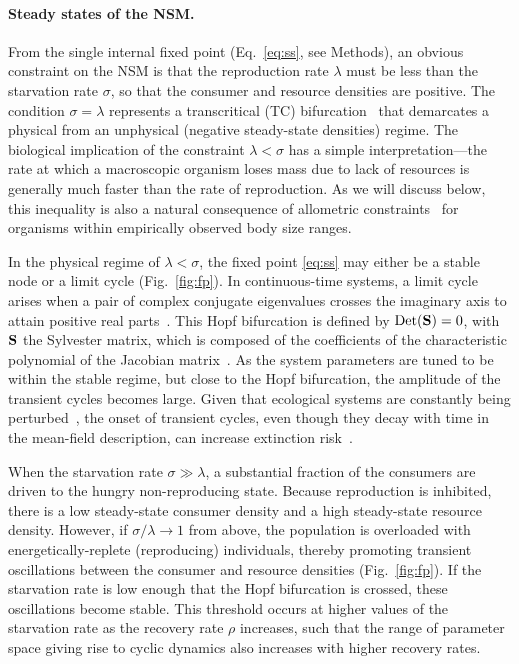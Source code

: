 \documentclass[twocolumn,preprintnumbers,amsmath,amssymb,superscriptaddress]{revtex4}
\begin{document}


\noindent \paragraph*{ {\bf Steady states of the NSM.}} From the single
internal fixed point (Eq.~\eqref{eq:ss}, see Methods), an obvious constraint
on the NSM is that the reproduction rate $\lambda$ must be less than the
starvation rate $\sigma$, so that the consumer and resource densities are
positive.
The condition $\sigma = \lambda$ represents a transcritical (TC)
bifurcation~\citep{Strogatz:2008wo} that demarcates a physical from an
unphysical (negative steady-state densities) regime.  The biological
implication of the constraint $\lambda<\sigma$ has a simple
interpretation---the rate at which a macroscopic organism loses mass due to
lack of resources is generally much faster than the rate of reproduction.  As
we will discuss below, this inequality is also a natural consequence of
allometric constraints~\citep{Kempes:2012hy} for organisms within empirically
observed body size ranges. %

In the physical regime of $\lambda<\sigma$, the fixed point \eqref{eq:ss} may either be a stable node or a limit cycle (Fig.~\ref{fig:fp}).
In continuous-time systems, a limit cycle arises when a pair of complex conjugate eigenvalues crosses the imaginary axis to attain positive real parts~\citep{GuckHolmes}.
This Hopf bifurcation is defined by ${\rm Det}({\bf S}) = 0$, with $\bf S$ the Sylvester matrix, which is composed of the coefficients of the characteristic polynomial of the Jacobian matrix~\citep{Gross:2004p2428}.
As the system parameters are tuned to be within the stable regime, but close to the Hopf bifurcation, the amplitude of the transient cycles becomes large.
Given that ecological systems are constantly being perturbed~\citep{Hastings:2001jh}, the onset of transient cycles, even though they decay with time in the mean-field description, can increase extinction risk~\citep{Neubert:1997wk,Caswell:2005eo,Neubert:2009td}.

When the starvation rate $\sigma\gg\lambda$, a substantial fraction of the
consumers are driven to the hungry non-reproducing state.  Because
reproduction is inhibited, there is a low steady-state consumer density and a
high steady-state resource density.  However, if $\sigma/\lambda\to 1$ from
above, the population is overloaded with energetically-replete (reproducing)
individuals, thereby promoting transient oscillations between the consumer
and resource densities (Fig.~\ref{fig:fp}).  If the starvation rate is low
enough that the Hopf bifurcation is crossed, these oscillations become
stable.  This threshold occurs at higher values of the starvation rate as the recovery rate $\rho$ increases, such that the range of parameter space giving rise to cyclic dynamics also increases with higher recovery rates.\\
\end{document}
